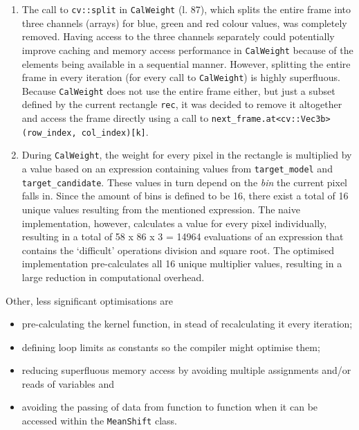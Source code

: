 \documentclass[final]{article}
\begin{document}
\begin{enumerate}
    \item The call to \texttt{cv::split} in \texttt{CalWeight} (l. 87), which splits the entire frame into three channels (arrays) for blue, green and red colour values, was completely removed.
    Having access to the three channels separately could potentially improve caching and memory access performance in \texttt{CalWeight} because of the elements being available in a sequential manner.
    However, splitting the entire frame in every iteration (for every call to \texttt{CalWeight}) is highly superfluous.
    Because \texttt{CalWeight} does not use the entire frame either, but just a subset defined by the current rectangle \texttt{rec}, it was decided to remove it altogether and access the frame directly using a call to \texttt{next\_frame.at<cv::Vec3b>(row\_index, col\_index)[k]}.

    \item During \texttt{CalWeight}, the weight for every pixel in the rectangle is multiplied by a value based on an expression containing values from \texttt{target\_model} and \texttt{target\_candidate}.
    These values in turn depend on the \emph{bin} the current pixel falls in.
    Since the amount of bins is defined to be 16, there exist a total of 16 unique values resulting from the mentioned expression.
    The naive implementation, however, calculates a value for every pixel individually, resulting in a total of 58 x 86 x 3 = 14964 evaluations of an expression that contains the `difficult' operations division and square root.
    The optimised implementation pre-calculates all 16 unique multiplier values, resulting in a large reduction in computational overhead.
\end{enumerate}

Other, less significant optimisations are
\begin{itemize}
     \item pre-calculating the kernel function, in stead of recalculating it every iteration;
     \item defining loop limits as constants so the compiler might optimise them;
     \item reducing superfluous memory access by avoiding multiple assignments and/or reads of variables and
     \item avoiding the passing of data from function to function when it can be accessed within the \texttt{MeanShift} class.
\end{itemize}
\end{document}
